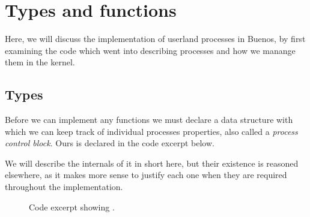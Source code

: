 %
%
%

\section{Types and functions}
Here, we will discuss the implementation of userland processes in Buenos, by
first examining the code which went into describing processes and how we
manange them in the kernel.

\subsection{Types}
Before we can implement any functions we must declare a data structure with
which we can keep track of individual processes properties, also called a
{\it process control block}. Ours is declared in the code excerpt below.

We will describe the internals of it in short here, but their existence is
reasoned elsewhere, as it makes more sense to justify each one when they are
required throughout the implementation.

\begin{figure}[H]
    
    \label{code:process_control_block_t}
    \caption{Code excerpt showing .}
\end{figure}

